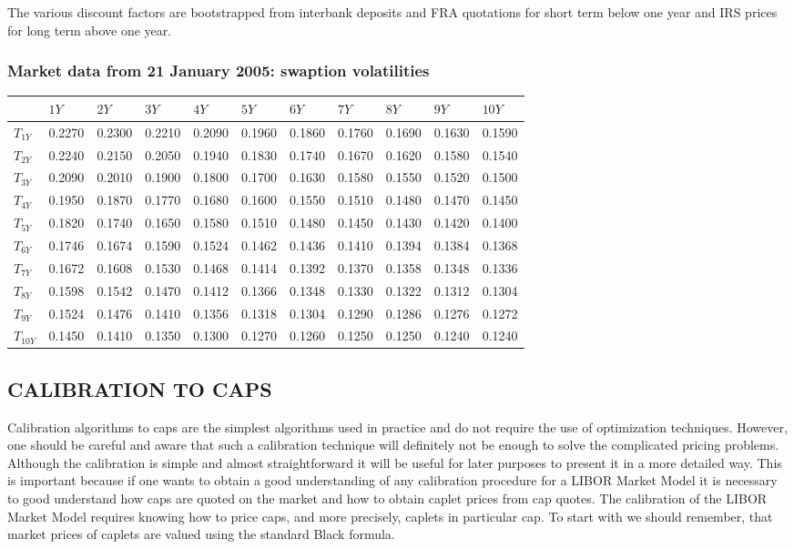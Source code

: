 \documentclass[11pt]{article}
\numberwithin{equation}{subsection}
\begin{document}
\newpage
The various discount factors are bootstrapped from interbank deposits and FRA quotations
for short term below one year and IRS prices for long term above one year.

\subsubsection{Market data from 21 January 2005: swaption volatilities}
\vskip 0.4cm 		
{
	\centering
	\begin{tabular}{|l|l|l|l|l|l|l|l|l|l|l|}
		\hline
		& \(1Y\) & \(2Y\) & \(3Y\) & \(4Y\) & \(5Y\) & \(6Y\) & \(7Y\) & \(8Y\) & \(9Y\) & \(10Y\) \\		
		\hline		
		\(T_{1Y}\) & 0.2270 & 0.2300 & 0.2210 & 0.2090 & 0.1960 & 0.1860 & 0.1760 & 0.1690 & 0.1630 & 0.1590 \\
		\(T_{2Y}\) & 0.2240 & 0.2150 & 0.2050 & 0.1940 & 0.1830 & 0.1740 & 0.1670 & 0.1620 & 0.1580 & 0.1540 \\
		\(T_{3Y}\) & 0.2090 & 0.2010 & 0.1900 & 0.1800 & 0.1700 & 0.1630 & 0.1580 & 0.1550 & 0.1520 & 0.1500 \\
		\(T_{4Y}\) & 0.1950 & 0.1870 & 0.1770 & 0.1680 & 0.1600 & 0.1550 & 0.1510 & 0.1480 & 0.1470 & 0.1450 \\
		\(T_{5Y}\) & 0.1820 & 0.1740 & 0.1650 & 0.1580 & 0.1510 & 0.1480 & 0.1450 & 0.1430 & 0.1420 & 0.1400 \\
		\(T_{6Y}\) & 0.1746 & 0.1674 & 0.1590 & 0.1524 & 0.1462 & 0.1436 & 0.1410 & 0.1394 & 0.1384 & 0.1368 \\
		\(T_{7Y}\) & 0.1672 & 0.1608 & 0.1530 & 0.1468 & 0.1414 & 0.1392 & 0.1370 & 0.1358 & 0.1348 & 0.1336 \\
		\(T_{8Y}\) & 0.1598 & 0.1542 & 0.1470 & 0.1412 & 0.1366 & 0.1348 & 0.1330 & 0.1322 & 0.1312 & 0.1304 \\
		\(T_{9Y}\) & 0.1524 & 0.1476 & 0.1410 & 0.1356 & 0.1318 & 0.1304 & 0.1290 & 0.1286 & 0.1276 & 0.1272 \\
		\(T_{10Y}\) & 0.1450 & 0.1410 & 0.1350 & 0.1300 & 0.1270 & 0.1260 & 0.1250 & 0.1250 & 0.1240 & 0.1240 \\	
		\hline				 				
	\end{tabular}
}
\vskip 0.4cm

\subsection{CALIBRATION TO CAPS}
Calibration algorithms to caps are the simplest algorithms used in practice and do not
require the use of optimization techniques. However, one should be careful and aware that
such a calibration technique will definitely not be enough to solve the complicated pricing
problems. Although the calibration is simple and almost straightforward it will be useful for
later purposes to present it in a more detailed way. This is important because if one wants to
obtain a good understanding of any calibration procedure for a LIBOR Market Model it is
necessary to good understand how caps are quoted on the market and how to obtain caplet
prices from cap quotes.
The calibration of the LIBOR Market Model requires knowing how to price caps, and
more precisely, caplets in particular cap. To start with we should remember, that market
prices of caplets are valued using the standard Black formula.
\end{document}

